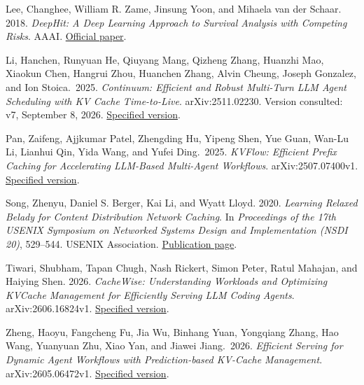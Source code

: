 \documentclass[sigconf, screen, review]{acmart}
\begin{document}
Lee, Changhee, William R. Zame, Jinsung Yoon, and Mihaela van der
Schaar. 2018. \emph{DeepHit: A Deep Learning Approach to Survival
Analysis with Competing Risks}. AAAI.
\href{https://cdn.aaai.org/ojs/11842/11842-13-15370-1-2-20201228.pdf}{Official
paper}.

Li, Hanchen, Runyuan He, Qiuyang Mang, Qizheng Zhang, Huanzhi Mao, Xiaokun Chen, Hangrui Zhou, Huanchen Zhang, Alvin Cheung, Joseph Gonzalez, and Ion Stoica.~2025. \emph{Continuum: Efficient and Robust
Multi-Turn LLM Agent Scheduling with KV Cache Time-to-Live}.
arXiv:2511.02230. Version consulted: v7, September 8, 2026.
\href{https://arxiv.org/abs/2511.02230v7}{Specified version}.

Pan, Zaifeng, Ajjkumar Patel, Zhengding Hu, Yipeng Shen, Yue Guan, Wan-Lu Li, Lianhui Qin, Yida Wang, and Yufei Ding.~2025. \emph{KVFlow: Efficient Prefix Caching for
Accelerating LLM-Based Multi-Agent Workflows}. arXiv:2507.07400v1.
\href{https://arxiv.org/abs/2507.07400v1}{Specified version}.

Song, Zhenyu, Daniel S. Berger, Kai Li, and Wyatt Lloyd. 2020. \emph{Learning Relaxed Belady for
Content Distribution Network Caching}. In \emph{Proceedings of the 17th USENIX Symposium on Networked Systems Design and Implementation (NSDI 20)}, 529--544. USENIX Association.
\href{https://www.usenix.org/conference/nsdi20/presentation/song}{Publication page}.

Tiwari, Shubham, Tapan Chugh, Nash Rickert, Simon Peter, Ratul Mahajan,
and Haiying Shen. 2026. \emph{CacheWise: Understanding Workloads and
Optimizing KVCache Management for Efficiently Serving LLM Coding
Agents}. arXiv:2606.16824v1.
\href{https://arxiv.org/abs/2606.16824v1}{Specified version}.

Zheng, Haoyu, Fangcheng Fu, Jia Wu, Binhang Yuan, Yongqiang Zhang, Hao Wang, Yuanyuan Zhu, Xiao Yan, and Jiawei Jiang.~2026. \emph{Efficient Serving for Dynamic Agent
Workflows with Prediction-based KV-Cache Management}.
arXiv:2605.06472v1. \href{https://arxiv.org/abs/2605.06472v1}{Specified
version}.
\end{document}
